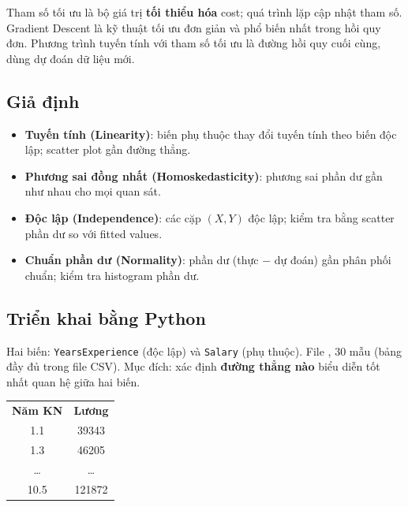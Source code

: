 \begin{phuongphap}[title={Tối ưu hóa}]
Tham số tối ưu là bộ giá trị \textbf{tối thiểu hóa} cost; quá trình lặp cập nhật tham số.
Gradient Descent là kỹ thuật tối ưu đơn giản và phổ biến nhất trong hồi quy đơn.
Phương trình tuyến tính với tham số tối ưu là đường hồi quy cuối cùng, dùng dự đoán dữ liệu mới.
\end{phuongphap}

\subsection{Giả định}

\begin{luuy}[title={Giả định mô hình hồi quy đơn}]
\begin{itemize}
  \item \textbf{Tuyến tính (Linearity)}: biến phụ thuộc thay đổi tuyến tính theo biến độc lập; scatter plot gần đường thẳng.
  \item \textbf{Phương sai đồng nhất (Homoskedasticity)}: phương sai phần dư gần như nhau cho mọi quan sát.
  \item \textbf{Độc lập (Independence)}: các cặp $(X,Y)$ độc lập; kiểm tra bằng scatter phần dư so với fitted values.
  \item \textbf{Chuẩn phần dư (Normality)}: phần dư (thực $-$ dự đoán) gần phân phối chuẩn; kiểm tra histogram phần dư.
\end{itemize}
\end{luuy}

\subsection{Triển khai bằng Python}

\begin{dongco}[title={Dataset và mục đích}]
Hai biến: \texttt{YearsExperience} (độc lập) và \texttt{Salary} (phụ thuộc).
File , 30 mẫu (bảng đầy đủ trong file CSV).
Mục đích: xác định \textbf{đường thẳng nào} biểu diễn tốt nhất quan hệ giữa hai biến.
\end{dongco}

\begin{phuongphap}[title={Bảng dữ liệu (trích)}]
\begin{center}
\small
\begin{tabular}{cc}
\textbf{Năm KN} & \textbf{Lương} \\
1.1 & 39343 \\
1.3 & 46205 \\
\ldots & \ldots \\
10.5 & 121872 \\
\end{tabular}
\end{center}
\end{phuongphap}

